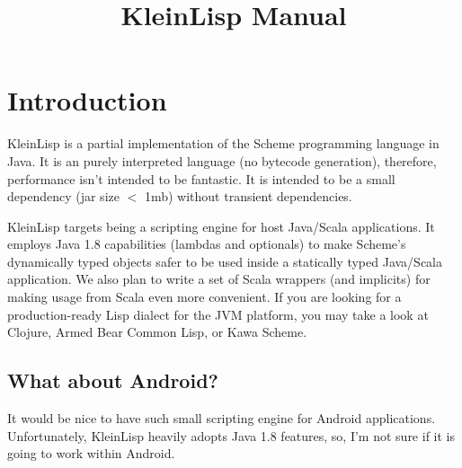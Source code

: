 \documentclass{article}
\title{KleinLisp Manual}
\begin{document}
\maketitle
\tableofcontents

\section{Introduction}

KleinLisp is a partial implementation of the Scheme programming language in Java. It is an purely interpreted language (no bytecode generation), therefore, performance isn't intended to be fantastic. It is intended to be a small dependency (jar size $<$ 1mb) without transient dependencies.

KleinLisp targets being a scripting engine for host Java/Scala applications. It employs Java 1.8 capabilities (lambdas and optionals) to make  Scheme's dynamically typed objects safer to be used inside a statically typed Java/Scala application. We also plan to write a set of Scala wrappers (and implicits) for making usage from Scala even more convenient. If you are looking for a production-ready Lisp dialect for the JVM platform, you may take a look at Clojure, Armed Bear Common Lisp, or Kawa Scheme.

\subsection{What about Android?}

It would be nice to have such small scripting engine for Android applications. Unfortunately, KleinLisp heavily adopts Java 1.8 features, so, I'm not sure if it is going to work within Android.
\end{document}
